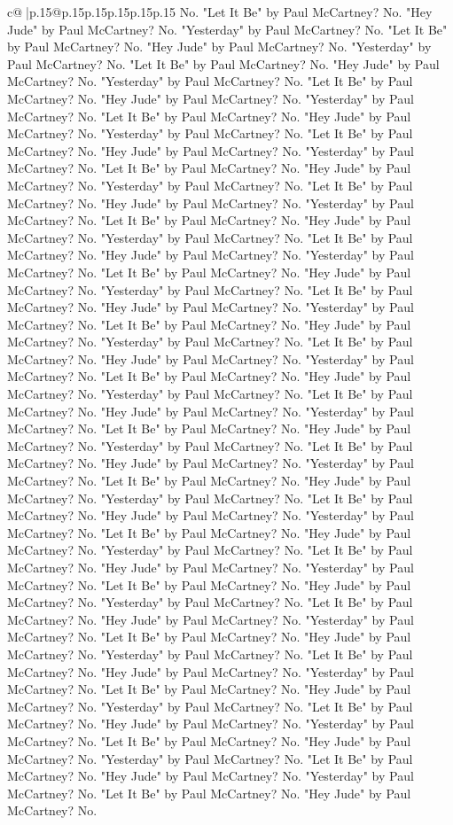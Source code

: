 \documentclass{article}
\begin{document}
{\begin{supertabular}{c@{$\;$}|p{.15\linewidth}@{}p{.15\linewidth}p{.15\linewidth}p{.15\linewidth}p{.15\linewidth}p{.15\linewidth}}
{{{No. "Let It Be" by Paul McCartney? No. "Hey Jude" by Paul McCartney? No. "Yesterday" by Paul McCartney? No. "Let It Be" by Paul McCartney? No. "Hey Jude" by Paul McCartney? No. "Yesterday" by Paul McCartney? No. "Let It Be" by Paul McCartney? No. "Hey Jude" by Paul McCartney? No. "Yesterday" by Paul McCartney? No. "Let It Be" by Paul McCartney? No. "Hey Jude" by Paul McCartney? No. "Yesterday" by Paul McCartney? No. "Let It Be" by Paul McCartney? No. "Hey Jude" by Paul McCartney? No. "Yesterday" by Paul McCartney? No. "Let It Be" by Paul McCartney? No. "Hey Jude" by Paul McCartney? No. "Yesterday" by Paul McCartney? No. "Let It Be" by Paul McCartney? No. "Hey Jude" by Paul McCartney? No. "Yesterday" by Paul McCartney? No. "Let It Be" by Paul McCartney? No. "Hey Jude" by Paul McCartney? No. "Yesterday" by Paul McCartney? No. "Let It Be" by Paul McCartney? No. "Hey Jude" by Paul McCartney? No. "Yesterday" by Paul McCartney? No. "Let It Be" by Paul McCartney? No. "Hey Jude" by Paul McCartney? No. "Yesterday" by Paul McCartney? No. "Let It Be" by Paul McCartney? No. "Hey Jude" by Paul McCartney? No. "Yesterday" by Paul McCartney? No. "Let It Be" by Paul McCartney? No. "Hey Jude" by Paul McCartney? No. "Yesterday" by Paul McCartney? No. "Let It Be" by Paul McCartney? No. "Hey Jude" by Paul McCartney? No. "Yesterday" by Paul McCartney? No. "Let It Be" by Paul McCartney? No. "Hey Jude" by Paul McCartney? No. "Yesterday" by Paul McCartney? No. "Let It Be" by Paul McCartney? No. "Hey Jude" by Paul McCartney? No. "Yesterday" by Paul McCartney? No. "Let It Be" by Paul McCartney? No. "Hey Jude" by Paul McCartney? No. "Yesterday" by Paul McCartney? No. "Let It Be" by Paul McCartney? No. "Hey Jude" by Paul McCartney? No. "Yesterday" by Paul McCartney? No. "Let It Be" by Paul McCartney? No. "Hey Jude" by Paul McCartney? No. "Yesterday" by Paul McCartney? No. "Let It Be" by Paul McCartney? No. "Hey Jude" by Paul McCartney? No. "Yesterday" by Paul McCartney? No. "Let It Be" by Paul McCartney? No. "Hey Jude" by Paul McCartney? No. "Yesterday" by Paul McCartney? No. "Let It Be" by Paul McCartney? No. "Hey Jude" by Paul McCartney? No. "Yesterday" by Paul McCartney? No. "Let It Be" by Paul McCartney? No. "Hey Jude" by Paul McCartney? No. "Yesterday" by Paul McCartney? No. "Let It Be" by Paul McCartney? No. "Hey Jude" by Paul McCartney? No. "Yesterday" by Paul McCartney? No. "Let It Be" by Paul McCartney? No. "Hey Jude" by Paul McCartney? No. "Yesterday" by Paul McCartney? No. "Let It Be" by Paul McCartney? No. "Hey Jude" by Paul McCartney? No. "Yesterday" by Paul McCartney? No. "Let It Be" by Paul McCartney? No. "Hey Jude" by Paul McCartney? No. "Yesterday" by Paul McCartney? No. "Let It Be" by Paul McCartney? No. "Hey Jude" by Paul McCartney? No. "Yesterday" by Paul McCartney? No. "Let It Be" by Paul McCartney? No. "Hey Jude" by Paul McCartney? No. "Yesterday" by Paul McCartney? No. "Let It Be" by Paul McCartney? No. "Hey Jude" by Paul McCartney? No. "Yesterday" by Paul McCartney? No. "Let It Be" by Paul McCartney? No. "Hey Jude" by Paul McCartney? No. "Yesterday" by Paul McCartney? No. "Let It Be" by Paul McCartney? No. "Hey Jude" by Paul McCartney? No. }}}
\end{supertabular}}
\end{document}
